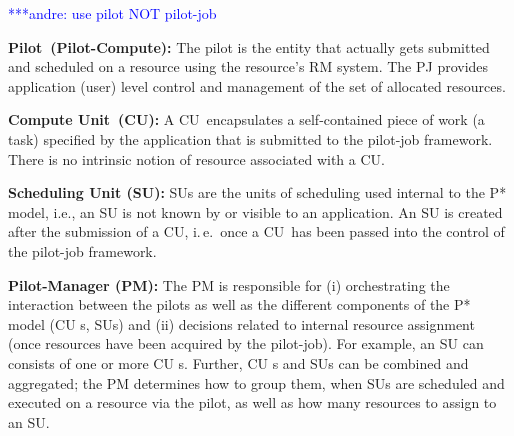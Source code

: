 \documentclass[conference,final]{IEEEtran}
\makeatletter
\def\blueuwave{\bgroup \markoverwith{\lower3.5\p@\hbox{\sixly \textcolor{blue}{\char58}}}\ULon}
\newcommand{\alwave}[1]{ {\blueuwave{#1}}}
\newcommand{\alnote}[1]{ {\textcolor{blue} { ***andre: #1 }}}
\newcommand{\alnote}[1]{}
\newcommand{\pilot}{Pilot\xspace}
\newcommand{\computeunit}{Compute Unit\xspace}
\newcommand{\cu}{CU\xspace}
\makeatother
\begin{document}
\alnote{use pilot NOT pilot-job}
\begin{compactitem}
\item \textbf{\pilot \ (Pilot-Compute):} The pilot is the
  entity that actually gets submitted and scheduled on a resource
  using the resource's RM system. The PJ provides application (user)
  level control and management of the set of allocated resources.



\item \textbf{\computeunit \ (\cu):} A \cu \ encapsulates a self-contained
  piece of work (a task) specified by the application that is
  submitted to the pilot-job framework.  There is no intrinsic notion
  of resource associated with a \cu.

\item \textbf{Scheduling Unit (SU):} SUs are the units of scheduling
  used internal to the P* model, i.e., an SU is not known by or
  visible to an application. An SU is created after the submission of
  a \cu, i.\,e.\ once a \cu \ has been passed into the control of the
  pilot-job framework.

\item \textbf{Pilot-Manager (PM):} The PM is responsible for (i)
  orchestrating the interaction between the pilots as well as the
  different components of the P* model (\cu s, SUs) and (ii) decisions
  related to internal resource assignment (once resources have been
  acquired by the pilot-job).  For example, an SU can consists of one
  or more \cu s. Further, \cu s and SUs can be combined and aggregated;
  the PM determines how to group them, when SUs are scheduled and
  executed on a resource via the pilot, as well as how many resources
  to assign to an SU.



\end{compactitem}
\end{document}
